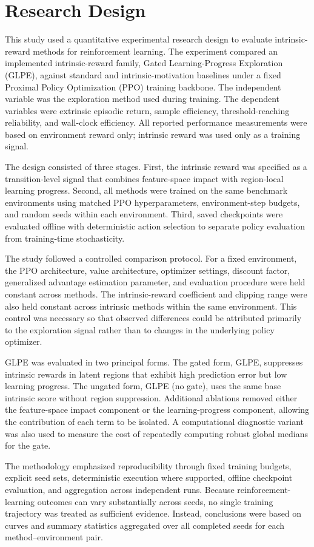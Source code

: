 \section{Research Design}
\label{sec:methodology_research_design}

This study used a quantitative experimental research design to evaluate intrinsic-reward methods for reinforcement learning.
The experiment compared an implemented intrinsic-reward family, Gated Learning-Progress Exploration (GLPE), against standard and intrinsic-motivation baselines under a fixed Proximal Policy Optimization (PPO) training backbone.
The independent variable was the exploration method used during training.
The dependent variables were extrinsic episodic return, sample efficiency, threshold-reaching reliability, and wall-clock efficiency.
All reported performance measurements were based on environment reward only; intrinsic reward was used only as a training signal.

The design consisted of three stages.
First, the intrinsic reward was specified as a transition-level signal that combines feature-space impact with region-local learning progress.
Second, all methods were trained on the same benchmark environments using matched PPO hyperparameters, environment-step budgets, and random seeds within each environment.
Third, saved checkpoints were evaluated offline with deterministic action selection to separate policy evaluation from training-time stochasticity.

The study followed a controlled comparison protocol.
For a fixed environment, the PPO architecture, value architecture, optimizer settings, discount factor, generalized advantage estimation parameter, and evaluation procedure were held constant across methods.
The intrinsic-reward coefficient and clipping range were also held constant across intrinsic methods within the same environment.
This control was necessary so that observed differences could be attributed primarily to the exploration signal rather than to changes in the underlying policy optimizer.

GLPE was evaluated in two principal forms.
The gated form, GLPE, suppresses intrinsic rewards in latent regions that exhibit high prediction error but low learning progress.
The ungated form, GLPE (no gate), uses the same base intrinsic score without region suppression.
Additional ablations removed either the feature-space impact component or the learning-progress component, allowing the contribution of each term to be isolated.
A computational diagnostic variant was also used to measure the cost of repeatedly computing robust global medians for the gate.

The methodology emphasized reproducibility through fixed training budgets, explicit seed sets, deterministic execution where supported, offline checkpoint evaluation, and aggregation across independent runs.
Because reinforcement-learning outcomes can vary substantially across seeds, no single training trajectory was treated as sufficient evidence.
Instead, conclusions were based on curves and summary statistics aggregated over all completed seeds for each method--environment pair.